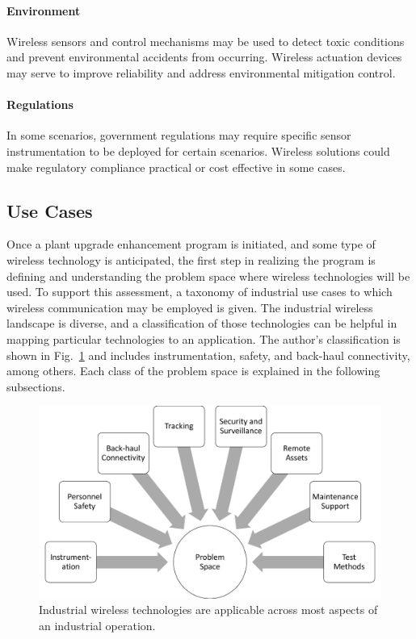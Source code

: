 	\paragraph{Environment} Wireless sensors and control mechanisms may be used to detect toxic conditions and prevent environmental accidents from occurring.  Wireless actuation devices may serve to improve reliability and address environmental mitigation control. 
	\paragraph{Regulations} In some scenarios, government regulations may require specific sensor instrumentation to be deployed for certain scenarios.  Wireless solutions could make regulatory compliance practical or cost effective in some cases.
      
    \subsection{Use Cases}
    
    Once a plant upgrade enhancement program is initiated, and some type of wireless technology is anticipated, the first step in realizing the program is defining and understanding the problem space where wireless technologies will be used. To support this assessment, a taxonomy of industrial use cases to which wireless communication may be employed is given.  The industrial wireless landscape is diverse, and a classification of those technologies can be helpful in mapping particular technologies to an application.  The author's classification is shown in Fig.~\ref{fig:problemspace} and includes instrumentation, safety, and back-haul connectivity, among others. Each class of the problem space is explained in the following subsections.  

\begin{figure}[t]
\centering
\includegraphics[width=\columnwidth]{./chapter-reswk/figs/probsp}
\caption{Industrial wireless technologies are applicable across most aspects of an industrial operation.}
\label{fig:problemspace}
\end{figure}   

